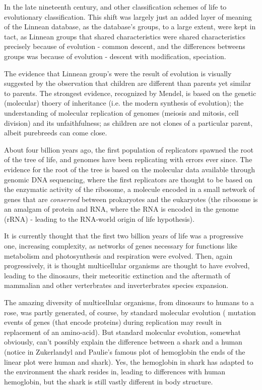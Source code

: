 In the late nineteenth century,  and other classification schemes of life to evolutionary classification.  This shift was largely just an added layer of meaning of the Linnean database, as the database's groups, to a large extent, were kept in tact, as Linnean groups that shared characteristics were shared characteristics precisely because of evolution - common descent, and the differences betweens groups was because of evolution - descent with modification, speciation.    

The evidence that Linnean group's were the result of evolution is visually suggested by the observation that children are different than parents yet similar to parents.  The strongest evidence, recognized by Mendel, is based on the genetic (molecular) thoery of inheritance (i.e. the modern synthesis of evolution); the understanding of molecular replication of genomes (meiosis and mitosis, cell division) and its unfaithfulness; as children are not clones of a particular parent, albeit purebreeds can come close.  

About four billion years ago, the first population of replicators spawned the root of the tree of life, and genomes have been replicating with errors ever since.  The evidence for the root of the tree is based on the molecular data available through genomic DNA sequencing, where the first replicators are thought to be based on the enzymatic activity of the ribosome, a molecule encoded in a small network of genes that are \textit{conserved} between prokaryotes and the eukaryotes (the ribosome is an amalgam of protein and RNA, where the RNA is encoded in the genome (rRNA) - leading to the RNA-world origin of life hypothesis).

It is currently thought that the first two billion years of life was a progressive one, increasing complexity, as networks of genes necessary for functions like metabolism and photosynthesis and respiration were evolved.  Then, again progressively, it is thought multicellular organisms are thought to have evolved, leading to the dinosaurs, their meteoritic extinction and the aftermath of mammalian and other verterbrates and inverterbrates species expansion.

The amazing diversity of multicellular organisms, from dinosaurs to humans to a rose, was partly generated, of course, by standard molecular evolution ( mutation events of genes (that encode proteins) during replication may result in replacement of an amino-acid).  But standard molecular evolution, somewhat obviously, can't possibly explain the difference between a shark and a human (notice in Zukerlandyl and Paulie's famous plot of hemoglobin the ends of the linear plot were human and shark).  Yes, the hemoglobin in shark has adapted to the environment the shark resides in, leading to differences with human hemoglobin, but the shark is still vastly different in body structure.

